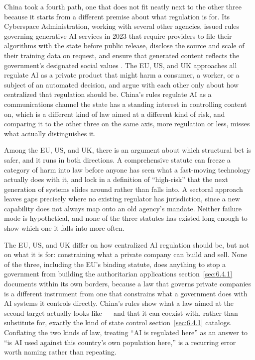 China took a fourth path, one that does not fit neatly next to the other three because it starts from a different premise about what regulation is for. Its Cyberspace Administration, working with several other agencies, issued rules governing generative AI services in 2023 that require providers to file their algorithms with the state before public release, disclose the source and scale of their training data on request, and ensure that generated content reflects the government's designated social values \autocite{cac2023generativeai}. The EU, US, and UK approaches all regulate AI as a private product that might harm a consumer, a worker, or a subject of an automated decision, and argue with each other only about how centralized that regulation should be. China's rules regulate AI as a communications channel the state has a standing interest in controlling content on, which is a different kind of law aimed at a different kind of risk, and comparing it to the other three on the same axis, more regulation or less, misses what actually distinguishes it.

Among the EU, US, and UK, there is an argument about which structural bet is safer, and it runs in both directions. A comprehensive statute can freeze a category of harm into law before anyone has seen what a fast-moving technology actually does with it, and lock in a definition of “high-risk” that the next generation of systems slides around rather than falls into. A sectoral approach leaves gaps precisely where no existing regulator has jurisdiction, since a new capability does not always map onto an old agency's mandate. Neither failure mode is hypothetical, and none of the three statutes has existed long enough to show which one it falls into more often.

The EU, US, and UK differ on how centralized AI regulation should be, but not on what it is for: constraining what a private company can build and sell. None of the three, including the EU's binding statute, does anything to stop a government from building the authoritarian applications section~\ref{sec:6.4.1} documents within its own borders, because a law that governs private companies is a different instrument from one that constrains what a government does with AI systems it controls directly. China's rules show what a law aimed at the second target actually looks like — and that it can coexist with, rather than substitute for, exactly the kind of state control section~\ref{sec:6.4.1} catalogs. Conflating the two kinds of law, treating “AI is regulated here” as an answer to “is AI used against this country's own population here,” is a recurring error worth naming rather than repeating.
